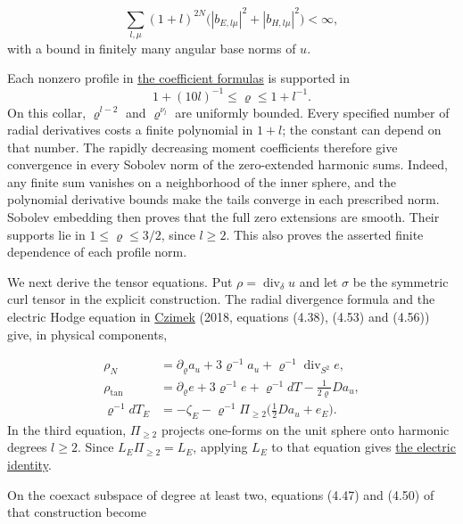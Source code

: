 \documentclass[
  english,
  11pt,
  reqno]{amsart}
\begin{document}
\label{eq:online-momentum-rapid-moments} \[
\sum_{l,\mu}(1+l)^{2N}
  \bigl(|b_{E,l\mu}|^2+|b_{H,l\mu}|^2\bigr)<\infty,
\] with a bound in finitely many angular base norms of \(u\).

Each nonzero profile in
\hyperref[eq:online-momentum-profile-coefficients]{the coefficient
formulas} is supported in \[
1+(10l)^{-1}\le\varrho\le1+l^{-1}.
\] On this collar, \(\varrho^{l-2}\) and \(\varrho^{\nu_l}\) are
uniformly bounded. Every specified number of radial derivatives costs a
finite polynomial in \(1+l\); the constant can depend on that number.
The rapidly decreasing moment coefficients therefore give convergence in
every Sobolev norm of the zero-extended harmonic sums. Indeed, any
finite sum vanishes on a neighborhood of the inner sphere, and the
polynomial derivative bounds make the tails converge in each prescribed
norm. Sobolev embedding then proves that the full zero extensions are
smooth. Their supports lie in \(1\le\varrho\le3/2\), since \(l\ge2\).
This also proves the asserted finite dependence of each profile norm.

We next derive the tensor equations. Put
\(\rho=\operatorname{div}_\delta u\) and let \(\sigma\) be the symmetric
curl tensor in the explicit construction. The radial divergence formula
and the electric Hodge equation in \hyperref[ref-Czimek2018]{Czimek}
(2018, equations (4.38), (4.53) and (4.56)) give, in physical
components,

\label{eq:online-momentum-radial-divergence} \[
\begin{aligned}
\rho_N
 &=\partial_\varrho a_u+3\varrho^{-1}a_u
                         +\varrho^{-1}\operatorname{div}_{S^2}e,\\
\rho_{\mathrm{tan}}
 &=\partial_\varrho e+3\varrho^{-1}e
          +\varrho^{-1}dT-\tfrac1{2\varrho}Da_u,\\
\varrho^{-1}dT_E
 &=-\zeta_E-\varrho^{-1}\Pi_{\ge2}\bigl(\tfrac12Da_u+e_E\bigr).
\end{aligned}
\] In the third equation, \(\Pi_{\ge2}\) projects one-forms on the unit
sphere onto harmonic degrees \(l\ge2\). Since \(L_E\Pi_{\ge2}=L_E\),
applying \(L_E\) to that equation gives
\hyperref[eq:online-momentum-electric-range]{the electric identity}.

On the coexact subspace of degree at least two, equations (4.47) and
(4.50) of that construction become
\end{document}
